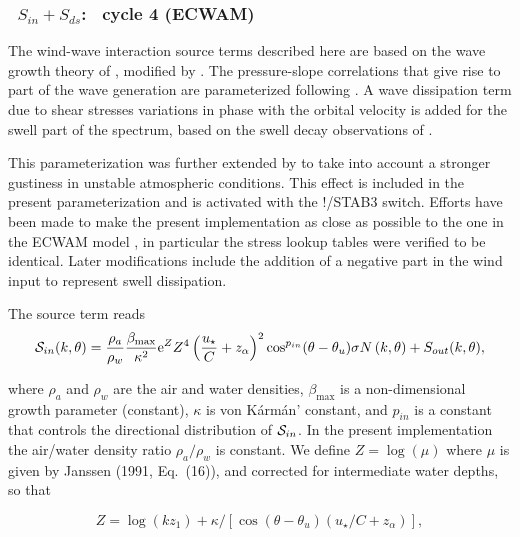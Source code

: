 \vsssub
\subsubsection{~$S_{in} + S_{ds}$: \wam\ cycle 4 (ECWAM)} \label{sec:ST3}
\vsssub


\noindent 
The wind-wave interaction source terms described here are based on the wave
growth theory of \cite{art:Miles57}, modified by \cite{art:Jan82}. The
pressure-slope correlations that give rise to part of the wave generation are
parameterized following \cite{art:Jan91}. A wave dissipation term due to shear
stresses variations in phase with the orbital velocity is added for the swell
part of the spectrum, based on the swell decay observations of
\cite{art:ACC09}.

This parameterization was further extended by \cite{rep:AB02} to take into
account a stronger gustiness in unstable atmospheric conditions. This effect is
included in the present parameterization and is activated with the {\code
!/STAB3} switch. Efforts have been made to make the present implementation as
close as possible to the one in the ECWAM model \citep{rep:Bea05}, in
particular the stress lookup tables were verified to be identical. 
Later modifications include the addition of a negative part in the wind input 
to represent swell dissipation.

The source term reads \citep{bk:Jan04}
\begin{equation}
{\cal S}_{in}(k,\theta) =
\frac{\rho_a}{\rho_w}\frac{\beta_{\mathrm{max}}}{\kappa^2}{\mathrm e}^{Z}Z^4
\left(\frac{u_\star}{C}+z_\alpha\right)^2 \cos^{p_{in}}(\theta - \theta_u) \sigma N
\left(k,\theta\right) + S_{out}(k,\theta),\label{eq:SinWAM4}
\end{equation}

\noindent where $\rho_a$ and $\rho_w$ are the air and water densities,
$\beta_{\mathrm{max}}$ is a non-dimensional growth parameter (constant),
$\kappa$ is von K\'{a}rm\'{a}n' constant, and $p_{in}$ is a constant that
controls the directional distribution of ${\cal S}_{in}$. In the present
implementation the air/water density ratio ${\rho_a}/{\rho_w}$ is constant. We
define $Z=\log(\mu)$ where $\mu$ is given by Janssen (1991, Eq.~(16)), and
corrected for intermediate water depths, so that

\begin{equation}
Z=\log(k z_1)+\kappa/\left[\cos\left(\theta - \theta_u\right)
\left(u_\star/C + z_\alpha \right)\right],
\end{equation}

